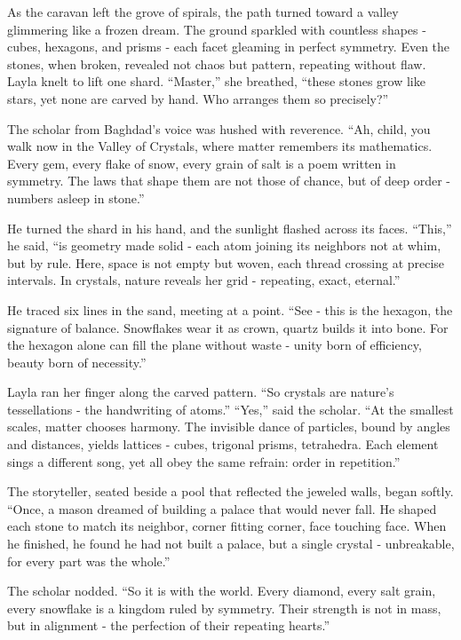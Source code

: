 \documentclass[
  letterpaper,
  DIV=11,
  numbers=noendperiod]{scrreprt}
\begin{document}
As the caravan left the grove of spirals, the path turned toward a
valley glimmering like a frozen dream. The ground sparkled with
countless shapes - cubes, hexagons, and prisms - each facet gleaming in
perfect symmetry. Even the stones, when broken, revealed not chaos but
pattern, repeating without flaw. Layla knelt to lift one shard.
``Master,'' she breathed, ``these stones grow like stars, yet none are
carved by hand. Who arranges them so precisely?''

The scholar from Baghdad's voice was hushed with reverence. ``Ah, child,
you walk now in the Valley of Crystals, where matter remembers its
mathematics. Every gem, every flake of snow, every grain of salt is a
poem written in symmetry. The laws that shape them are not those of
chance, but of deep order - numbers asleep in stone.''

He turned the shard in his hand, and the sunlight flashed across its
faces. ``This,'' he said, ``is geometry made solid - each atom joining
its neighbors not at whim, but by rule. Here, space is not empty but
woven, each thread crossing at precise intervals. In crystals, nature
reveals her grid - repeating, exact, eternal.''

He traced six lines in the sand, meeting at a point. ``See - this is the
hexagon, the signature of balance. Snowflakes wear it as crown, quartz
builds it into bone. For the hexagon alone can fill the plane without
waste - unity born of efficiency, beauty born of necessity.''

Layla ran her finger along the carved pattern. ``So crystals are
nature's tessellations - the handwriting of atoms.'' ``Yes,'' said the
scholar. ``At the smallest scales, matter chooses harmony. The invisible
dance of particles, bound by angles and distances, yields lattices -
cubes, trigonal prisms, tetrahedra. Each element sings a different song,
yet all obey the same refrain: order in repetition.''

The storyteller, seated beside a pool that reflected the jeweled walls,
began softly. ``Once, a mason dreamed of building a palace that would
never fall. He shaped each stone to match its neighbor, corner fitting
corner, face touching face. When he finished, he found he had not built
a palace, but a single crystal - unbreakable, for every part was the
whole.''

The scholar nodded. ``So it is with the world. Every diamond, every salt
grain, every snowflake is a kingdom ruled by symmetry. Their strength is
not in mass, but in alignment - the perfection of their repeating
hearts.''
\end{document}

